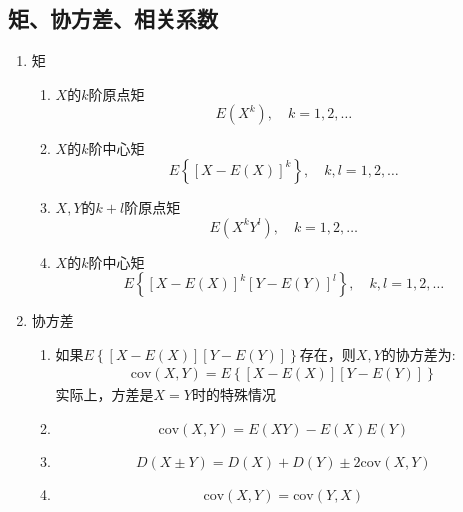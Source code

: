 \subsection{矩、协方差、相关系数}
\begin{enumerate}
	\item 矩
	\begin{enumerate}
		\item $X$的$k$阶原点矩
		\begin{equation}
			E(X^k), \quad k = 1, 2, \dots
		\end{equation}

		\item $X$的$k$阶中心矩
		\begin{equation}
			E\left\{\left[X-E(X) \right]^k\right\}, \quad k,l = 1, 2, \dots
		\end{equation}

		\item $X,Y$的$k+l$阶原点矩
		\begin{equation}
			E(X^kY^l), \quad k = 1, 2, \dots
		\end{equation}

		\item $X$的$k$阶中心矩
		\begin{equation}
			E\left\{\left[X-E(X) \right]^k \left[Y-E(Y) \right]^l\right\}, \quad k,l = 1, 2, \dots
		\end{equation}
	\end{enumerate}
	
	\item 协方差 \\
	\begin{enumerate}
		\item 如果$E\left\{\left[X-E(X)\right]\left[Y-E(Y)\right]\right\}$存在，则$X,Y$的协方差为:
		\begin{align}
			\mathrm{cov}(X,Y) = E\left\{\left[X-E(X)\right]\left[Y-E(Y)\right]\right\}
		\end{align}
		实际上，方差是$X=Y$时的特殊情况

		\item 
		\begin{equation}
			\mathrm{cov}(X,Y) = E(XY) - E(X)E(Y)
		\end{equation}

		\item 
		\begin{equation}
			D(X\pm Y) = D(X) + D(Y) \pm 2\mathrm{cov}(X,Y)
		\end{equation}

		\item 
		\begin{equation}
			\mathrm{cov}(X,Y) = \mathrm{cov}(Y,X)
		\end{equation}


\end{enumerate}
\end{enumerate}

